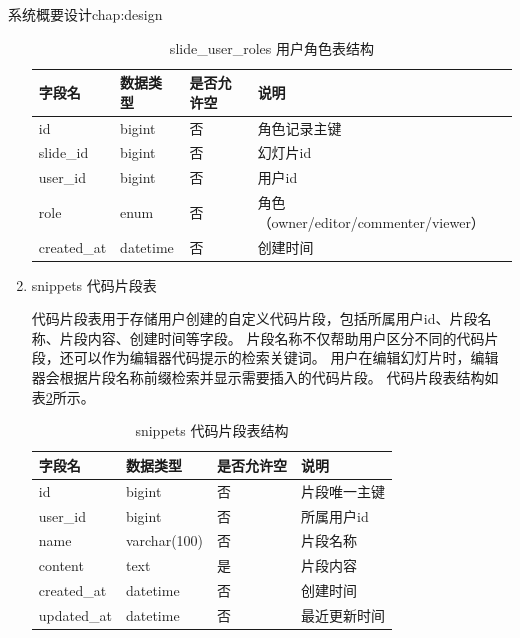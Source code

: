 \begin{cuzchapter}{系统概要设计}{chap:design}
\begin{enumerate}
    \begin{table}[htbp]
        \centering
        \caption{slide\_user\_roles 用户角色表结构}
        \label{tab:slide-user-roles}
        \begin{tabular}{llll}
            \toprule
            字段名         & 数据类型     & 是否允许空 & 说明                                \\
            \midrule
            id          & bigint   & 否     & 角色记录主键                            \\
            slide\_id   & bigint   & 否     & 幻灯片id                             \\
            user\_id    & bigint   & 否     & 用户id                              \\
            role        & enum     & 否     & 角色（owner/editor/commenter/viewer） \\
            created\_at & datetime & 否     & 创建时间                              \\
            \bottomrule
        \end{tabular}
    \end{table}

 

    \item snippets 代码片段表

    代码片段表用于存储用户创建的自定义代码片段，包括所属用户id、片段名称、片段内容、创建时间等字段。
    片段名称不仅帮助用户区分不同的代码片段，还可以作为编辑器代码提示的检索关键词。
    用户在编辑幻灯片时，编辑器会根据片段名称前缀检索并显示需要插入的代码片段。
    代码片段表结构如表\ref{tab:snippets}所示。

    \begin{table}[htbp]
        \centering
        \caption{snippets 代码片段表结构}
        \label{tab:snippets}
        \begin{tabular}{llll}
            \toprule
            字段名         & 数据类型         & 是否允许空 & 说明     \\
            \midrule
            id          & bigint       & 否     & 片段唯一主键 \\
            user\_id    & bigint       & 否     & 所属用户id \\
            name        & varchar(100) & 否     & 片段名称   \\
            content     & text         & 是     & 片段内容   \\
            created\_at & datetime     & 否     & 创建时间   \\
            updated\_at & datetime     & 否     & 最近更新时间 \\
            \bottomrule
        \end{tabular}
    \end{table}


\end{enumerate}
\end{cuzchapter}

